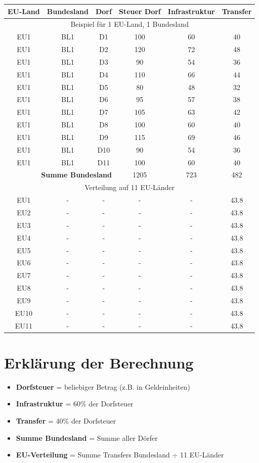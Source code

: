 \documentclass[a4paper,12pt]{article}
\begin{document}
\begin{tabular}{c c c c c c}
\toprule
EU-Land & Bundesland & Dorf & Steuer Dorf & Infrastruktur & Transfer \\
\midrule
\multicolumn{6}{c}{Beispiel für 1 EU-Land, 1 Bundesland} \\
\midrule
EU1 & BL1 & D1 & 100 & 60 & 40 \\
EU1 & BL1 & D2 & 120 & 72 & 48 \\
EU1 & BL1 & D3 & 90 & 54 & 36 \\
EU1 & BL1 & D4 & 110 & 66 & 44 \\
EU1 & BL1 & D5 & 80 & 48 & 32 \\
EU1 & BL1 & D6 & 95 & 57 & 38 \\
EU1 & BL1 & D7 & 105 & 63 & 42 \\
EU1 & BL1 & D8 & 100 & 60 & 40 \\
EU1 & BL1 & D9 & 115 & 69 & 46 \\
EU1 & BL1 & D10 & 90 & 54 & 36 \\
EU1 & BL1 & D11 & 100 & 60 & 40 \\
\midrule
\multicolumn{3}{r}{\textbf{Summe Bundesland}} & 1205 & 723 & 482 \\
\midrule
\multicolumn{6}{c}{Verteilung auf 11 EU-Länder} \\
\midrule
EU1 & - & - & - & - & 43.8 \\
EU2 & - & - & - & - & 43.8 \\
EU3 & - & - & - & - & 43.8 \\
EU4 & - & - & - & - & 43.8 \\
EU5 & - & - & - & - & 43.8 \\
EU6 & - & - & - & - & 43.8 \\
EU7 & - & - & - & - & 43.8 \\
EU8 & - & - & - & - & 43.8 \\
EU9 & - & - & - & - & 43.8 \\
EU10 & - & - & - & - & 43.8 \\
EU11 & - & - & - & - & 43.8 \\
\bottomrule
\end{tabular}

\section{Erklärung der Berechnung}

\begin{itemize}
\item \textbf{Dorfsteuer} = beliebiger Betrag (z.B. in Geldeinheiten)  
\item \textbf{Infrastruktur} = 60\% der Dorfsteuer  
\item \textbf{Transfer} = 40\% der Dorfsteuer  
\item \textbf{Summe Bundesland} = Summe aller Dörfer  
\item \textbf{EU-Verteilung} = Summe Transfers Bundesland $\div$ 11 EU-Länder  
\end{itemize}
\end{document}
